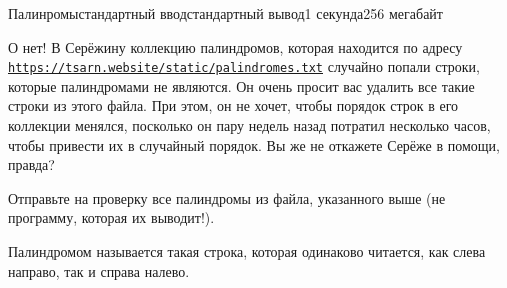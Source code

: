\begin{problem}{Палинромы}{стандартный ввод}{стандартный вывод}{1 секунда}{256 мегабайт}

\providecommand{\url}[1]{\underline{\texttt{#1}}}

О нет! В Серёжину коллекцию палиндромов, которая находится по адресу \url{https://tsarn.website/static/palindromes.txt} случайно попали строки, которые палиндромами не являются. Он очень просит вас удалить все такие строки из этого файла. При этом, он не хочет, чтобы порядок строк в его коллекции менялся, посколько он пару недель назад потратил несколько часов, чтобы привести их в случайный порядок. Вы же не откажете Серёже в помощи, правда?

\OutputFile
Отправьте на проверку все палиндромы из файла, указанного выше (не программу, которая их выводит!).


\Note
Палиндромом называется такая строка, которая одинаково читается, как слева направо, так и справа налево.

\end{problem}

